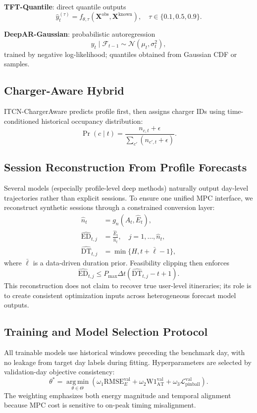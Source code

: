 \documentclass[journal]{IEEEtran}
\newcommand{\AT}{\mathrm{AT}}
\newcommand{\DT}{\mathrm{DT}}
\newcommand{\ED}{\mathrm{ED}}
\newcommand{\Wone}{\mathrm{W1}}
\newcommand{\RMSE}{\mathrm{RMSE}}
\newcommand{\argmin}{\operatorname*{arg\,min}}
\begin{document}
\textbf{TFT-Quantile}: direct quantile outputs
\begin{equation}
\hat{y}^{(\tau)}_t=f_{\theta,\tau}(\mathbf{X}^{\mathrm{obs}},\mathbf{X}^{\mathrm{known}}),\quad \tau\in\{0.1,0.5,0.9\}.
\end{equation}

\textbf{DeepAR-Gaussian}: probabilistic autoregression
\begin{equation}
y_t\mid\mathcal{F}_{t-1}\sim\mathcal{N}(\mu_t,\sigma_t^2),
\end{equation}
trained by negative log-likelihood; quantiles obtained from Gaussian CDF or samples.

\subsection{Charger-Aware Hybrid}
ITCN-ChargerAware predicts profile first, then assigns charger IDs using time-conditioned historical occupancy distribution:
\begin{equation}
\Pr(c\mid t) = \frac{n_{c,t}+\epsilon}{\sum_{c'}(n_{c',t}+\epsilon)}.
\end{equation}

\subsection{Session Reconstruction From Profile Forecasts}
Several models (especially profile-level deep methods) naturally output day-level trajectories rather than explicit sessions. To ensure one unified MPC interface, we reconstruct synthetic sessions through a constrained conversion layer:
\begin{align}
\hat{n}_t &= g_n(\hat{A}_t,\hat{E}_t),\\
\hat{\ED}_{t,j} &= \frac{\hat{E}_t}{\hat{n}_t},\quad j=1,\dots,\hat{n}_t,\\
\hat{\DT}_{t,j} &= \min\{H, t+\bar{\ell}-1\},
\end{align}
where $\bar{\ell}$ is a data-driven duration prior. Feasibility clipping then enforces
\begin{equation}
\hat{\ED}_{t,j} \le P_{\max}\Delta t(\hat{\DT}_{t,j}-t+1).
\end{equation}
This reconstruction does not claim to recover true user-level itineraries; its role is to create consistent optimization inputs across heterogeneous forecast model outputs.

\subsection{Training and Model Selection Protocol}
All trainable models use historical windows preceding the benchmark day, with no leakage from target day labels during fitting. Hyperparameters are selected by validation-day objective consistency:
\begin{equation}
\theta^* = \argmin_{\theta\in\Theta}\left(\omega_1\RMSE_E^{\mathrm{val}}+\omega_2\Wone_{\AT}^{\mathrm{val}}+\omega_3\mathcal{L}_{\mathrm{pinball}}^{\mathrm{val}}\right).
\end{equation}
The weighting emphasizes both energy magnitude and temporal alignment because MPC cost is sensitive to on-peak timing misalignment.
\end{document}
